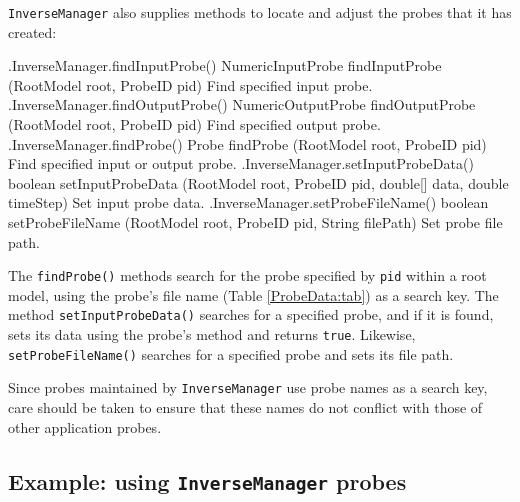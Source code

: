 {\tt InverseManager} also supplies methods to locate and adjust the probes that
it has created:
%
\begin{methodtable}{0.65}{0.35}
\midline
%
\methodentry
{\inverse.InverseManager.findInputProbe()}%
{NumericInputProbe findInputProbe (RootModel root, ProbeID pid)}%
{Find specified input probe.}%
%
\methodentry
{\inverse.InverseManager.findOutputProbe()}%
{NumericOutputProbe findOutputProbe (RootModel root, ProbeID pid)}%
{Find specified output probe.}%
%
\methodentry
{\inverse.InverseManager.findProbe()}%
{Probe findProbe (RootModel root, ProbeID pid)}%
{Find specified input or output probe.}%
%
\methodspace{0.5em}%
%
\methodentry
{\inverse.InverseManager.setInputProbeData()}%
{boolean setInputProbeData (RootModel root, \brh ProbeID pid,
double[] data, double timeStep)}%
{Set input probe data.}%
%
\methodspace{0.5em}%
\methodentry
{\inverse.InverseManager.setProbeFileName()}%
{boolean setProbeFileName (RootModel root, \brh ProbeID pid,
String filePath)}%
{Set probe file path.}%
%
\midline
\end{methodtable}
%
The {\tt findProbe()} methods search for the probe specified by {\tt pid}
within a root model, using the probe's file name (Table \ref{ProbeData:tab}) as
a search key. The method {\tt setInputProbeData()} searches for a specified
probe, and if it is found, sets its data using the probe's 
method and returns {\tt true}. Likewise, {\tt setProbeFileName()} searches for
a specified probe and sets its file path.

\begin{sideblock}
Since probes maintained by {\tt InverseManager} use probe names as a search
key, care should be taken to ensure that these names do not conflict with those
of other application probes.
\end{sideblock}

\subsection{Example: using {\tt InverseManager} probes}

